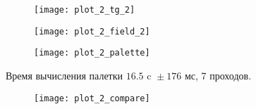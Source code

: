 \begin{figure}[H]
\texttt{[image: plot\_2\_tg\_2]}
\caption{}
\end{figure}

\begin{figure}[H]
\texttt{[image: plot\_2\_field\_2]}
\caption{}
\end{figure}

\begin{figure}[H]
\texttt{[image: plot\_2\_palette]}
\caption{}
\end{figure}

Время вычисления палетки ${16.5 \text{ c } \pm 176 \text{ мс}}$, 7 проходов.

\begin{figure}[H]
\texttt{[image: plot\_2\_compare]}
\caption{}
\end{figure}

\clearpage
